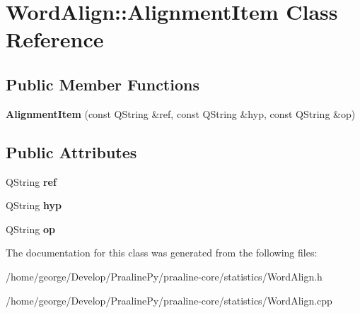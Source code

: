\hypertarget{class_word_align_1_1_alignment_item}{}\section{Word\+Align\+:\+:Alignment\+Item Class Reference}
\label{class_word_align_1_1_alignment_item}
\subsection*{Public Member Functions}
\begin{DoxyCompactItemize}
\item 
\mbox{\label{class_word_align_1_1_alignment_item_a44439a807a52da0be651d9279ecf59ca}} 
{\bfseries Alignment\+Item} (const Q\+String \&ref, const Q\+String \&hyp, const Q\+String \&op)
\end{DoxyCompactItemize}
\subsection*{Public Attributes}
\begin{DoxyCompactItemize}
\item 
\mbox{\label{class_word_align_1_1_alignment_item_a7f2f98e1194b4fc042435e965e141a39}} 
Q\+String {\bfseries ref}
\item 
\mbox{\label{class_word_align_1_1_alignment_item_a65c34ef9336d312f149e2421775ac0c9}} 
Q\+String {\bfseries hyp}
\item 
\mbox{\label{class_word_align_1_1_alignment_item_aeb5cdfd2b7975618259c972a1f0a39bc}} 
Q\+String {\bfseries op}
\end{DoxyCompactItemize}


The documentation for this class was generated from the following files\+:\begin{DoxyCompactItemize}
\item 
/home/george/\+Develop/\+Praaline\+Py/praaline-\/core/statistics/Word\+Align.\+h\item 
/home/george/\+Develop/\+Praaline\+Py/praaline-\/core/statistics/Word\+Align.\+cpp\end{DoxyCompactItemize}

